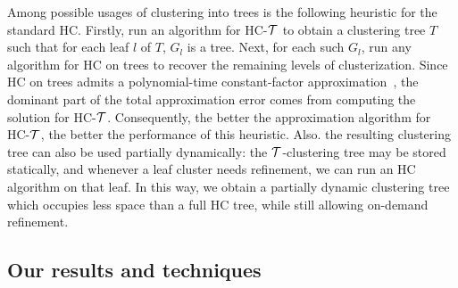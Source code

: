 Among possible usages of clustering into trees is the following heuristic for the standard \textsc{HC}. Firstly, run an algorithm for \textsc{HC-$\mathcal{T}$} to obtain a clustering tree $T$ such that for each leaf $l$ of $T$, $G_l$ is a tree. Next, for each such $G_l$, run any algorithm for \textsc{HC} on trees to recover the remaining levels of clusterization.
Since \textsc{HC} on trees admits a polynomial-time constant-factor approximation~\cite{ApproximateHierarchicalClusteringViaSparsestCutAndSpreadingMetrics}, the dominant part of the total approximation error comes from computing the solution for \textsc{HC-$\mathcal{T}$}. Consequently, the better the approximation algorithm for \textsc{HC-$\mathcal{T}$}, the better the performance of this heuristic.
Also. the resulting clustering tree can also be used partially dynamically: the $\mathcal{T}$-clustering tree may be stored statically, and whenever a leaf cluster needs refinement, we can run an \textsc{HC} algorithm on that leaf. In this way, we obtain a partially dynamic clustering tree which occupies less space than a full \textsc{HC} tree, while still allowing on-demand refinement.


% 
%

\subsection{Our results and techniques}

